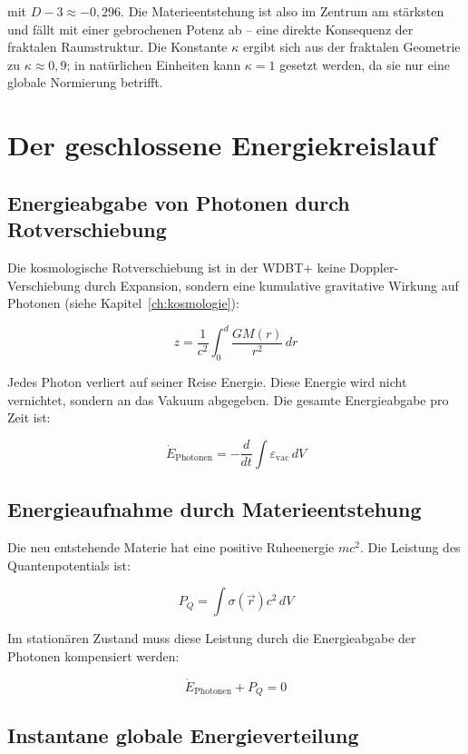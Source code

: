 mit \( D-3 \approx -0,296 \). Die Materieentstehung ist also im Zentrum am stärksten und fällt mit einer gebrochenen Potenz ab – eine direkte Konsequenz der fraktalen Raumstruktur. Die Konstante \( \kappa \) ergibt sich aus der fraktalen Geometrie zu \( \kappa \approx 0,9 \); in natürlichen Einheiten kann \( \kappa = 1 \) gesetzt werden, da sie nur eine globale Normierung betrifft.

\section{Der geschlossene Energiekreislauf}
\label{app:materieentstehung_kreislauf}

\subsection{Energieabgabe von Photonen durch Rotverschiebung}
\label{sub:materieentstehung_rotverschiebung}

Die kosmologische Rotverschiebung ist in der WDBT+ keine Doppler-Verschiebung durch Expansion, sondern eine kumulative gravitative Wirkung auf Photonen (siehe Kapitel~\ref{ch:kosmologie}):

\[
z = \frac{1}{c^2} \int_0^d \frac{GM(r)}{r^2} \, dr
\]

Jedes Photon verliert auf seiner Reise Energie. Diese Energie wird nicht vernichtet, sondern an das Vakuum abgegeben. Die gesamte Energieabgabe pro Zeit ist:

\[
\dot{E}_{\text{Photonen}} = -\frac{d}{dt} \int \varepsilon_{\text{vac}} \, dV
\]

\subsection{Energieaufnahme durch Materieentstehung}
\label{sub:materieentstehung_aufnahme}

Die neu entstehende Materie hat eine positive Ruheenergie \( mc^2 \). Die Leistung des Quantenpotentials ist:

\[
P_Q = \int \sigma(\vec{r}) c^2 \, dV
\]

Im stationären Zustand muss diese Leistung durch die Energieabgabe der Photonen kompensiert werden:

\[
\dot{E}_{\text{Photonen}} + P_Q = 0
\]

\subsection{Instantane globale Energieverteilung}
\label{sub:materieentstehung_instantan}

